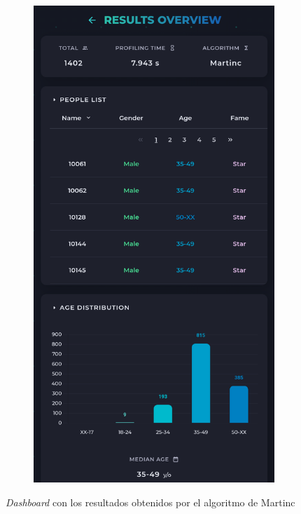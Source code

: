 \begin{figure}[H]
\begin{subfigure}[c]{0.21\textwidth}
		\includegraphics[width=\textwidth]{imagenes/dashboard-martinc-500_movil.png}
		\label{fig:casouso_dashboard_martinc_movil}
	\end{subfigure}
	\vspace{-1\baselineskip}
	\caption{\textit{Dashboard} con los resultados obtenidos por el algoritmo de Martinc \cite{martinc2019hot}}
	\label{fig:casouso_dashboard_martinc}
\end{figure}


